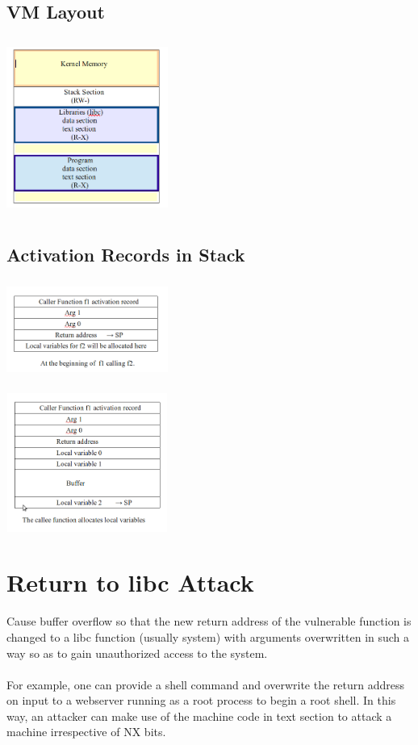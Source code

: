 \documentclass[11pt]{article} %
\begin{document}
\subsection{VM Layout}
\begin{center}
\includegraphics [width=200px,height=220px] {img/img1.png}
\end{center}

\subsection{Activation Records in Stack}
\begin{center}
\includegraphics [width=200px,height=120px] {img/img2.png}
\end{center}
\begin{center}
\includegraphics [width=200px,height=172px] {img/img3.png}
\end{center}

\section {Return to libc Attack}
Cause buffer overflow so that the new return address of the vulnerable function
is changed to a libc function (usually system) with arguments overwritten in
such a way so as to gain unauthorized access to the system.\\
\\
For example, one can provide a shell command and overwrite the return address on
input to a webserver running as a root process to begin a root shell.  In this
way, an attacker can make use of the machine code in text section to attack a
machine irrespective of NX bits. 
\end{document}
